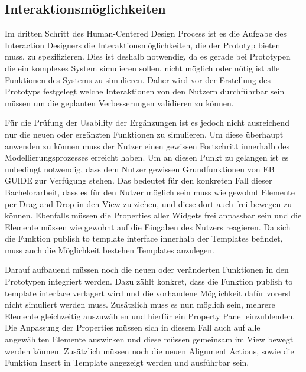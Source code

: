\subsection{Interaktionsmöglichkeiten}

Im dritten Schritt des Human-Centered Design Process ist es die Aufgabe des Interaction Designers die Interaktionsmöglichkeiten, die der Prototyp bieten muss, zu spezifizieren.
Dies ist deshalb notwendig, da es gerade bei Prototypen die ein komplexes System simulieren sollen, nicht möglich oder nötig ist alle Funktionen des Systems zu simulieren.
Daher wird vor der Erstellung des Prototyps festgelegt welche Interaktionen von den Nutzern durchführbar sein müssen um die geplanten Verbesserungen validieren zu können.

Für die Prüfung der Usability der Ergänzungen ist es jedoch nicht ausreichend nur die neuen oder ergänzten Funktionen zu simulieren.
Um diese überhaupt anwenden zu können muss der Nutzer einen gewissen Fortschritt innerhalb des Modellierungsprozesses erreicht haben.
Um an diesen Punkt zu gelangen ist es unbedingt notwendig, dass dem Nutzer gewissen Grundfunktionen von EB GUIDE zur Verfügung stehen.
Das bedeutet für den konkreten Fall dieser Bachelorarbeit, dass es für den Nutzer möglich sein muss wie gewohnt Elemente per Drag and Drop in den View zu ziehen, und diese dort auch frei bewegen zu können.
Ebenfalls müssen die Properties aller Widgets frei anpassbar sein und die Elemente müssen wie gewohnt auf die Eingaben des Nutzers reagieren.
Da sich die Funktion \glqq publish to template interface\grqq{} innerhalb der Templates befindet, muss auch die Möglichkeit bestehen Templates anzulegen.

Darauf aufbauend müssen noch die neuen oder veränderten Funktionen in den Prototypen integriert werden.
Dazu zählt konkret, dass die Funktion \glqq publish to template interface\grqq{} verlagert wird und die vorhandene Möglichkeit dafür vorerst nicht simuliert werden muss.
Zusätzlich muss es nun möglich sein, mehrere Elemente gleichzeitig auszuwählen und hierfür ein Property Panel einzublenden.
Die Anpassung der Properties müssen sich in diesem Fall auch auf alle angewählten Elemente auswirken und diese müssen gemeinsam im View bewegt werden können.
Zusätzlich müssen noch die neuen Alignment Actions, sowie die Funktion \glqq Insert in Template\grqq{} angezeigt werden und ausführbar sein.

